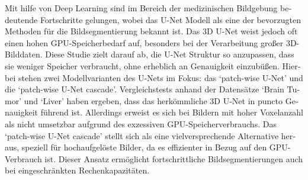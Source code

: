\null\vfil
\begin{otherlanguage}{ngerman}
\begin{center}\textsf{\textbf{\abstractname}}\end{center}

\noindent Mit hilfe von Deep Learning sind im Bereich der medizinischen Bildgebung bedeutende Fortschritte gelungen,
wobei das U-Net Modell als eine der bevorzugten Methoden für die Bildsegmentierung bekannt ist.
Das $3$D U-Net weist jedoch oft einen hohen GPU-Speicherbedarf auf, besonders bei der Verarbeitung großer $3$D-Bilddaten.
Diese Studie zielt darauf ab, die U-Net Struktur so anzupassen, dass sie weniger Speicher verbraucht,
ohne erheblich an Genauigkeit einzubüßen. Hierbei stehen zwei Modellvarianten des U-Nets im Fokus:
das `patch-wise U-Net' und die `patch-wise U-Net cascade'. Vergleichstests anhand der Datensätze `Brain Tumor'
und `Liver' haben ergeben, dass das herkömmliche $3$D U-Net in puncto Genauigkeit führend ist.
Allerdings erweist es sich bei Bildern mit hoher Voxelanzahl als nicht umsetzbar aufgrund des exzessiven GPU-Speicherverbrauchs.
Das `patch-wise U-Net cascade' stellt sich als eine vielversprechende Alternative heraus, speziell für hochaufgelöste Bilder,
da es effizienter in Bezug auf den GPU-Verbrauch ist.
Dieser Ansatz ermöglicht fortschrittliche Bildsegmentierungen auch bei eingeschränkten Rechenkapazitäten.
\end{otherlanguage}
\vfil\null

